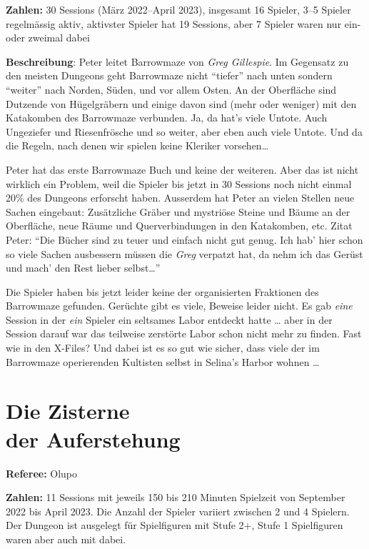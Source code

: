 \documentclass[11pt]{wbzine}
\begin{document}
\begin{multicols}{2}
\textbf{Zahlen:} 30 Sessions (März 2022--April 2023),
insgesamt 16 Spieler,
3--5 Spieler regelmässig aktiv,
aktivster Spieler hat 19 Sessions,
aber 7 Spieler waren nur ein- oder zweimal dabei

\textbf{Beschreibung}: Peter leitet Barrowmaze von \textit{Greg Gillespie}.
Im Gegensatz zu den meisten Dungeons geht Barrowmaze nicht ``tiefer'' nach
unten sondern ``weiter'' nach Norden, Süden, und vor allem Osten. An der
Oberfläche sind Dutzende von Hügelgräbern und einige davon sind (mehr oder
weniger) mit den Katakomben des Barrowmaze verbunden. Ja, da hat's viele
Untote. Auch Ungeziefer und Riesenfrösche und so weiter, aber eben auch
viele Untote. Und da die Regeln, nach denen wir spielen keine Kleriker
vorsehen\dots{}

Peter hat das erste Barrowmaze Buch und keine der weiteren. Aber das ist
nicht wirklich ein Problem, weil die Spieler bis jetzt in 30 Sessions noch
nicht einmal 20\% des Dungeons erforscht haben. Ausserdem hat Peter an
vielen Stellen neue Sachen eingebaut: Zusätzliche Gräber und mystriöse
Steine und Bäume an der Oberfläche, neue Räume und Querverbindungen in
den Katakomben, etc. Zitat Peter: ``Die Bücher sind zu teuer und einfach
nicht gut genug. Ich hab' hier schon so viele Sachen ausbessern müssen die
\textit{Greg} verpatzt hat, da nehm ich das Gerüst und mach' den Rest
lieber selbst\dots{}''

Die Spieler haben bis jetzt leider keine der organisierten
Fraktionen des Barrowmaze gefunden. Gerüchte gibt es viele, Beweise
leider nicht. Es gab \emph{eine} Session in der \emph{ein} Spieler
ein seltsames Labor entdeckt hatte \dots{} aber in der Session
darauf war das teilweise zerstörte Labor schon nicht mehr zu finden.
Fast wie in den X-Files? Und dabei ist es so gut wie sicher, dass
viele der im Barrowmaze operierenden Kultisten selbst in Selina's
Harbor wohnen \dots{}

\section{Die Zisterne\\ der Auferstehung}
\label{zisterne}
\textbf{Referee:} Olupo

\textbf{Zahlen:} 11 Sessions mit jeweils 150 bis 210 Minuten Spielzeit von
September 2022 bis April 2023. Die Anzahl der Spieler variiert zwischen
2 und 4 Spielern. Der Dungeon ist ausgelegt für Spielfiguren mit Stufe
2+, Stufe 1 Spielfiguren waren aber auch mit dabei.


\end{multicols}
\end{document}
